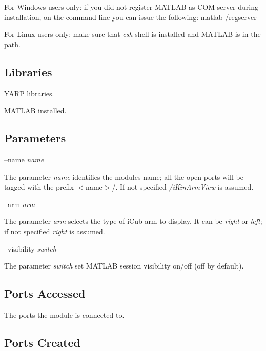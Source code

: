For Windows users only\+: if you did not register M\+A\+T\+L\+AB as C\+OM server during installation, on the command line you can issue the following\+: matlab /regserver

For Linux users only\+: make sure that {\itshape csh} shell is installed and M\+A\+T\+L\+AB is in the path.\hypertarget{group__icub__signalScope_lib_sec}{}\subsection{Libraries}\label{group__icub__signalScope_lib_sec}

\begin{DoxyItemize}
\item Y\+A\+RP libraries.
\item M\+A\+T\+L\+AB installed.
\end{DoxyItemize}\hypertarget{group__icub__signalScope_parameters_sec}{}\subsection{Parameters}\label{group__icub__signalScope_parameters_sec}
--name {\itshape name} 
\begin{DoxyItemize}
\item The parameter {\itshape name} identifies the module\textquotesingle{}s name; all the open ports will be tagged with the prefix $<$name$>$/. If not specified {\itshape /i\+Kin\+Arm\+View} is assumed.
\end{DoxyItemize}

--arm {\itshape arm} 
\begin{DoxyItemize}
\item The parameter {\itshape arm} selects the type of i\+Cub arm to display. It can be {\itshape right} or {\itshape left}; if not specified {\itshape right} is assumed.
\end{DoxyItemize}

--visibility {\itshape switch} 
\begin{DoxyItemize}
\item The parameter {\itshape switch} set M\+A\+T\+L\+AB session visibility on/off (off by default).
\end{DoxyItemize}\hypertarget{group__icub__signalScope_portsa_sec}{}\subsection{Ports Accessed}\label{group__icub__signalScope_portsa_sec}
The ports the module is connected to.\hypertarget{group__icub__signalScope_portsc_sec}{}\subsection{Ports Created}\label{group__icub__signalScope_portsc_sec}

